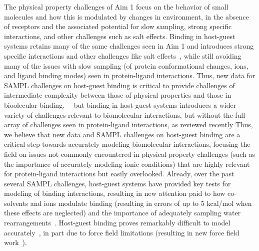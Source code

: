\documentclass[11pt]{article}
\begin{document}
The physical property challenges of Aim 1 focus on the behavior of small molecules and how this is modulated by changes in environment, in the absence of receptors and the associated potential for slow sampling, strong specific interactions, and other challenges such as salt effects.
Binding in host-guest systems retains many of the same challenges seen in Aim 1 and introduces strong specific interactions and other challenges like salt effects~\cite{mobley_predicting_2016}, while still avoiding many of the issues with slow sampling (of protein conformational changes, ions, and ligand binding modes) seen in protein-ligand interactions.
Thus, new data for SAMPL challenges on host-guest binding is critical to provide challenges of intermediate complexity between those of physical properties and those in bioolecular binding.
---but binding in host-guest systems introduces a wider variety of challenges relevant to biomolecular interactions, but without the full array of challenges seen in protein-ligand interactions, as reviewed recently
Thus, we believe that new data and SAMPL challenges on host-guest binding are a critical step towards accurately modeling biomolecular interactions, focusing the field on issues not commonly encountered in physical property challenges (such as the importance of accurately modeling ionic conditions) that are highly relevant for protein-ligand interactions but easily overlooked.
Already, over the past several SAMPL challenges, host-guest systems have provided key tests for modeling of binding interactions, resulting in new attention paid to how co-solvents and ions modulate binding (resulting in errors of up to 5 kcal/mol when these effects are neglected) and the importance of adequately sampling water rearrangements~\cite{muddana_sampl4_2014, mobley_predicting_2016, yin_sampl5_preprint, bhakat_resolving_2016}. 
Host-guest binding proves remarkably difficult to model accurately~\cite{henriksen_computational_2015}, in part due to force field limitations (resulting in new force field work~\cite{yin_toward_2015}).
\end{document}
